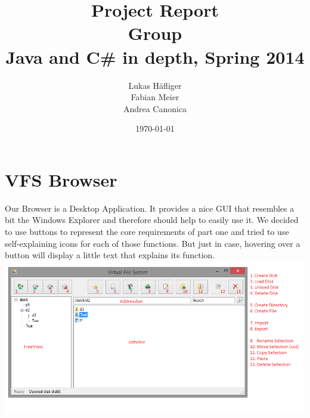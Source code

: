 \documentclass[a4paper,12pt]{article}
\title{
Project Report \\ 
Group \groupname \\
\vspace{5mm}
\large Java and C\# in depth, Spring 2014
}
\author{
Lukas Häfliger\\
Fabian Meier\\
Andrea Canonica
}
\date{\today}
\newcommand{\groupname}{Tortoise\xspace}
\begin{document}
\maketitle




\section{VFS Browser}

Our Browser is a Desktop Application. It provides a nice GUI that resembles a bit the Windows Explorer and therefore should help to easily use it. We decided to use buttons to represent the core requirements of part one and tried to use self-explaining icons for each of those functions. But just in case, 
hovering over a button will display a little text that explains its function. \\

\includegraphics[scale=0.6] {report2_GUI}
\end{document}
